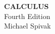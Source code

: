%
\thispagestyle{empty}
\vspace*{4cm}
\begin{center}
  {\fontsize{44}{52}\selectfont\bfseries CALCULUS}\\[1.2em]
  {\Large Fourth Edition}\\[4.5em]
  {\LARGE Michael Spivak}
\end{center}
\clearpage
